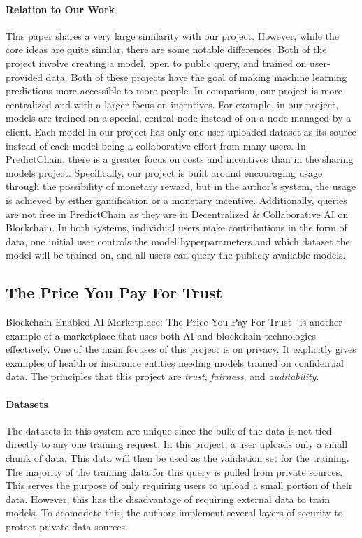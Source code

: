 \documentclass{article}
\begin{document}
    \paragraph{Relation to Our Work}
    This paper shares a very large similarity with our project.  However, while the core ideas are quite similar, there
    are some notable differences.  Both of the project involve creating a model, open to public query, and trained on
    user-provided data.  Both of these projects have the goal of making machine learning predictions more accessible
    to more people.  In comparison, our project is more centralized and with a larger focus on incentives.  For
    example, in our project, models are trained on a special, central node instead of on a node managed by a client.
    Each model in our project has only one user-uploaded dataset as its source instead of each model being a collaborative
    effort from many users.  In PredictChain, there is a greater focus on costs and incentives than in the sharing models
    project.  Specifically, our project is built around encouraging usage through the possibility of monetary reward,
    but in the author's system, the usage is achieved by either gamification or a monetary incentive.  Additionally,
    queries are not free in PredictChain as they are in Decentralized \& Collaborative AI on Blockchain.  In both systems,
    individual users make contributions in the form of data, one initial user controls the model hyperparameters and
    which dataset the model will be trained on, and all users can query the publicly available models.

    \subsection{The Price You Pay For Trust}

    Blockchain Enabled AI Marketplace: The Price You Pay For Trust~\cite{priceOfTrust} is another example of a marketplace
    that uses both AI and blockchain technologies effectively.  One of the main focuses of this project is on privacy.
    It explicitly gives examples of health or insurance entities needing models trained on confidential data.  The principles
    that this project are \textit{trust}, \textit{fairness}, and \textit{auditability}.

    \paragraph{Datasets}
    The datasets in this system are unique since the bulk of the data is not tied directly to any one training request.
    In this project, a user uploads only a small chunk of data.  This data will then be used as the validation set for
    the training.  The majority of the training data for this query is pulled from private sources.  This serves the purpose
    of only requiring users to upload a small portion of their data.  However, this has the disadvantage of requiring
    external data to train models.  To acomodate this, the authors implement several layers of security to protect private
    data sources.
\end{document}
